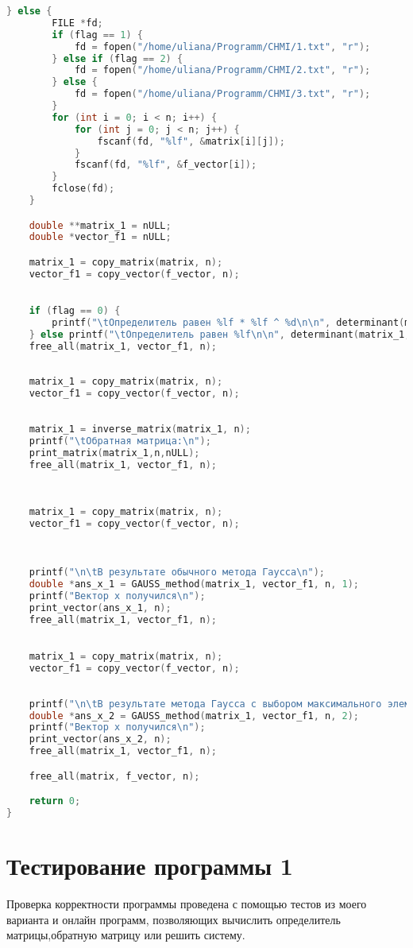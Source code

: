 \documentclass[a4paper,12pt,titlepage,finall]{article}
\begin{document}
\begin{lstlisting}[language=C, caption=main.c]
    } else {
        FILE *fd;
        if (flag == 1) {
            fd = fopen("/home/uliana/Programm/CHMI/1.txt", "r");
        } else if (flag == 2) {
            fd = fopen("/home/uliana/Programm/CHMI/2.txt", "r");
        } else {
            fd = fopen("/home/uliana/Programm/CHMI/3.txt", "r");
        }
        for (int i = 0; i < n; i++) {
            for (int j = 0; j < n; j++) {
                fscanf(fd, "%lf", &matrix[i][j]);
            }
            fscanf(fd, "%lf", &f_vector[i]);
        }
        fclose(fd);
    }

    double **matrix_1 = nULL;
    double *vector_f1 = nULL;

    matrix_1 = copy_matrix(matrix, n);
    vector_f1 = copy_vector(f_vector, n);

    
    if (flag == 0) {
        printf("\tОпределитель равен %lf * %lf ^ %d\n\n", determinant(matrix_1, n), tmp_num, n);
    } else printf("\tОпределитель равен %lf\n\n", determinant(matrix_1, n));
    free_all(matrix_1, vector_f1, n);
    
    
    matrix_1 = copy_matrix(matrix, n);
    vector_f1 = copy_vector(f_vector, n);
    
    
    matrix_1 = inverse_matrix(matrix_1, n);
    printf("\tОбратная матрица:\n");
    print_matrix(matrix_1,n,nULL);
    free_all(matrix_1, vector_f1, n);
    
    
    
    matrix_1 = copy_matrix(matrix, n);
    vector_f1 = copy_vector(f_vector, n);

    
    
    printf("\n\tВ результате обычного метода Гаусса\n");
    double *ans_x_1 = GAUSS_method(matrix_1, vector_f1, n, 1);
    printf("Вектор х получился\n");
    print_vector(ans_x_1, n);
    free_all(matrix_1, vector_f1, n);

    
    matrix_1 = copy_matrix(matrix, n);
    vector_f1 = copy_vector(f_vector, n);
    
    
    printf("\n\tВ результате метода Гаусса с выбором максимального элемента\n");
    double *ans_x_2 = GAUSS_method(matrix_1, vector_f1, n, 2);
    printf("Вектор х получился\n");
    print_vector(ans_x_2, n);
    free_all(matrix_1, vector_f1, n);

    free_all(matrix, f_vector, n);

    return 0;
}
\end{lstlisting}


\section{Тестирование программы 1}
Проверка корректности программы проведена с помощью тестов из моего варианта и онлайн программ, позволяющих вычислить определитель матрицы,обратную матрицу или решить систему.
\end{document}
